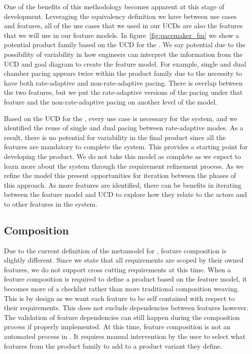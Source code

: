 One of the benefits of this methodology becomes apparent at this stage of development. Leveraging the equivalency definition we have between use cases and features, all of the use cases that we used in our UCDs are also the features that we will use in our feature models. In figure~\ref{fig:pacemaker_fm} we show a potential product family based on the UCD for the \pgd. We say potential due to the possibility of variability in how engineers can interpret the information from the UCD and goal diagram to create the feature model. For example, single and dual chamber pacing appears twice within the product family due to the necessity to have both rate-adaptive and non-rate-adaptive pacing. There is overlap between the two features, but we put the rate-adaptive versions of the pacing under that feature and the non-rate-adaptive pacing on another level of the model.

Based on the UCD for the \pgd, every use case is necessary for the system, and we identified the reuse of single and dual pacing between rate-adaptive modes. As a result, there is no potential for variability in the final product since all the features are mandatory to complete the system. This provides a starting point for developing the product. We do not take this model as complete as we expect to learn more about the system through the requirement refinement process. As we refine the model this present opportunities for iteration between the phases of this approach. As more features are identified, there can be benefits in iterating between the feature model and \ac{UCD} to explore how they relate to the actors and to other features in the system.


\subsection{Composition}

Due to the current definition of the metamodel for \tool, feature composition is slightly different. Since we state that all requirements are scoped by their owned features, we do not support cross cutting requirements at this time. When a feature composition is required to define a product based on the feature model, it becomes more of a checklist rather than more traditional composition weaving. This is by design as we want each feature to be self contained with respect to their requirements. This does not exclude dependencies between features however. The validation of feature dependencies can still happen during the composition process if properly implemented. At this time, feature composition is not an automated process in \tool. It requires manual intervention by the user to select what features from the product family to add to a product variant they define.

